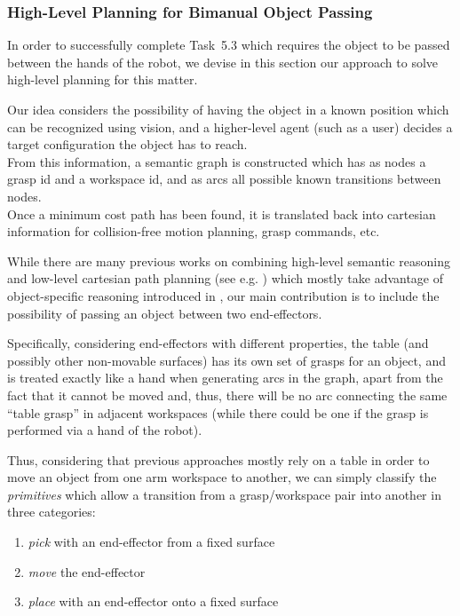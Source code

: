 
\subsubsection{High-Level Planning for Bimanual Object Passing}
\label{sec:HighLevelPlanningDualArm}

In order to successfully complete Task~5.3 which requires the object to be passed between the hands of the robot, we devise in this section our approach to solve high-level planning for this matter.

Our idea considers the possibility of having the object in a known position which can be recognized using vision, and a higher-level agent (such as a user) decides a target configuration the object has to reach.\\
From this information, a semantic graph is constructed which has as nodes a grasp id and a workspace id, and as arcs all possible known transitions between nodes.\\
Once a minimum cost path has been found, it is translated back into cartesian information for collision-free motion planning, grasp commands, etc.

While there are many previous works on combining high-level semantic reasoning and low-level cartesian path planning (see e.g. \cite{karlsson2012combining, leidner2012things, leidner2013hybrid}) which mostly take advantage of object-specific reasoning introduced in \cite{levison1996connecting}, our main contribution is to include the possibility of passing an object between two end-effectors.

Specifically, considering end-effectors with different properties, the table (and possibly other non-movable surfaces) has its own set of grasps for an object, and is treated exactly like a hand when generating arcs in the graph, apart from the fact that it cannot be moved and, thus, there will be no arc connecting the same ``table grasp'' in adjacent workspaces (while there could be one if the grasp is performed via a hand of the robot).

Thus, considering that previous approaches mostly rely on a table in order to move an object from one arm workspace to another, we can simply classify the \emph{primitives} which allow a transition from a grasp/workspace pair into another in three categories:
\begin{enumerate}
	\item \emph{pick} with an end-effector from a fixed surface
	\item \emph{move} the end-effector
	\item \emph{place} with an end-effector onto a fixed surface
\end{enumerate}

